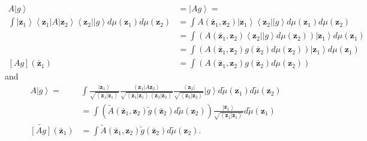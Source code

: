 \documentclass[aps,preprint]{revtex4}%
\begin{document}
\begin{align}
A\left\vert g\right\rangle  &  =\left\vert Ag\right\rangle =\nonumber\\
\int\left\vert \mathbf{z}_{1}\right\rangle \left\langle \mathbf{z}%
_{1}\right\vert A\left\vert \mathbf{z}_{2}\right\rangle \left\langle
\mathbf{z}_{2}\right\vert \left\vert g\right\rangle d\mu\left(  \mathbf{z}%
_{1}\right)  d\mu\left(  \mathbf{z}_{2}\right)   &  =\int A\left(
\mathbf{\bar{z}}_{1},\mathbf{z}_{2}\right)  \left\vert \mathbf{z}%
_{1}\right\rangle \left\langle \mathbf{z}_{2}\right\vert \left\vert
g\right\rangle d\mu\left(  \mathbf{z}_{1}\right)  d\mu\left(  \mathbf{z}%
_{2}\right)  \nonumber\\
&  =\int\left(  A\left(  \mathbf{\bar{z}}_{1},\mathbf{z}_{2}\right)
\left\langle \mathbf{z}_{2}\right\vert \left\vert g\right\rangle d\mu\left(
\mathbf{z}_{2}\right)  \right)  \left\vert \mathbf{z}_{1}\right\rangle
d\mu\left(  \mathbf{z}_{1}\right)  \nonumber\\
&  =\int\left(  A\left(  \mathbf{\bar{z}}_{1},\mathbf{z}_{2}\right)  g\left(
\mathbf{\bar{z}}_{2}\right)  d\mu\left(  \mathbf{z}_{2}\right)  \right)
\left\vert \mathbf{z}_{1}\right\rangle d\mu\left(  \mathbf{z}_{1}\right)
\nonumber\\
\left[  Ag\right]  \left(  \mathbf{\bar{z}}_{1}\right)   &  =\int\left(
A\left(  \mathbf{\bar{z}}_{1},\mathbf{z}_{2}\right)  g\left(  \mathbf{\bar{z}%
}_{2}\right)  d\mu\left(  \mathbf{z}_{2}\right)  \right)
\end{align}
and%
\begin{align}
A\left\vert g\right\rangle = &  \int\frac{\left\vert \mathbf{z}_{1}%
\right\rangle }{\sqrt{\left\langle \mathbf{z}_{1}\left\vert \mathbf{z}%
_{1}\right.  \right\rangle }}\frac{\left\langle \mathbf{z}_{1}\left\vert
A\mathbf{z}_{2}\right.  \right\rangle }{\sqrt{\left\langle \mathbf{z}%
_{1}\left\vert \mathbf{z}_{1}\right.  \right\rangle \left\langle
\mathbf{z}_{2}\left\vert \mathbf{z}_{2}\right.  \right\rangle }}%
\frac{\left\langle \mathbf{z}_{2}\right\vert }{\sqrt{\left\langle
\mathbf{z}_{2}\left\vert \mathbf{z}_{2}\right.  \right\rangle }}\left\vert
g\right\rangle d\tilde{\mu}\left(  \mathbf{z}_{1}\right)  d\tilde{\mu}\left(
\mathbf{z}_{2}\right)  \nonumber\\
&  =\int\left(  \tilde{A}\left(  \mathbf{\bar{z}}_{1},\mathbf{z}_{2}\right)
\tilde{g}\left(  \mathbf{\bar{z}}_{2}\right)  d\tilde{\mu}\left(
\mathbf{z}_{2}\right)  \right)  \frac{\left\vert \mathbf{z}_{1}\right\rangle
}{\sqrt{\left\langle \mathbf{z}_{1}\left\vert \mathbf{z}_{1}\right.
\right\rangle }}d\tilde{\mu}\left(  \mathbf{z}_{1}\right)  \nonumber\\
\widetilde{\left[  Ag\right]  }\left(  \mathbf{\bar{z}}_{1}\right)   &
=\int\tilde{A}\left(  \mathbf{\bar{z}}_{1},\mathbf{z}_{2}\right)  \tilde
{g}\left(  \mathbf{\bar{z}}_{2}\right)  d\tilde{\mu}\left(  \mathbf{z}%
_{2}\right)  .
\end{align}
\end{document}

